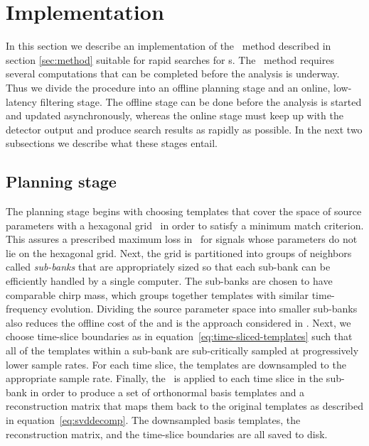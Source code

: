 \section{Implementation}
\label{sec:implementation}

In this section we describe an implementation of the \lloid\ method described
in section \ref{sec:method} suitable for rapid \GW{}
searches for \CBC{}s.  The \lloid\ method requires several
computations that can be completed before the analysis is underway.  Thus
we divide the procedure into an offline planning stage and an
online, low-latency filtering stage.  The offline stage can be done before the
analysis is started and updated asynchronously, whereas the online stage must
keep up with the detector output and produce search results as rapidly as
possible.  In the next two subsections we describe what these stages entail.

\subsection{Planning stage}

The planning stage begins with choosing templates that cover the space of
source parameters with a hexagonal grid~\citep{PhysRevD.76.102004} in order to
satisfy a minimum match criterion.  This assures a prescribed maximum loss in
\SNR\ for signals whose parameters do not lie on the hexagonal grid.  Next, the
grid is partitioned into groups of neighbors called \emph{sub-banks} that
are appropriately sized so that each sub-bank can be efficiently handled by a
single computer.  The sub-banks are chosen to have comparable chirp mass, which
groups together templates with similar time-frequency evolution.  Dividing the source
parameter space into smaller sub-banks also reduces the offline cost of the
\SVD{} and is the approach considered in \citet{Cannon:2010p10398}.  Next, we choose
time-slice boundaries as in equation~\eqref{eq:time-sliced-templates} such that all
of the templates within a sub-bank are sub-critically sampled at progressively lower
sample rates.  For each time slice, the templates are downsampled to the
appropriate sample rate.  Finally, the \SVD\ is applied to each time slice in
the sub-bank in order to produce a set of orthonormal basis templates and a
reconstruction matrix that maps them back to the original templates as
described in equation~\eqref{eq:svddecomp}.  The downsampled basis templates,
the reconstruction matrix, and the time-slice boundaries are all saved to disk.

